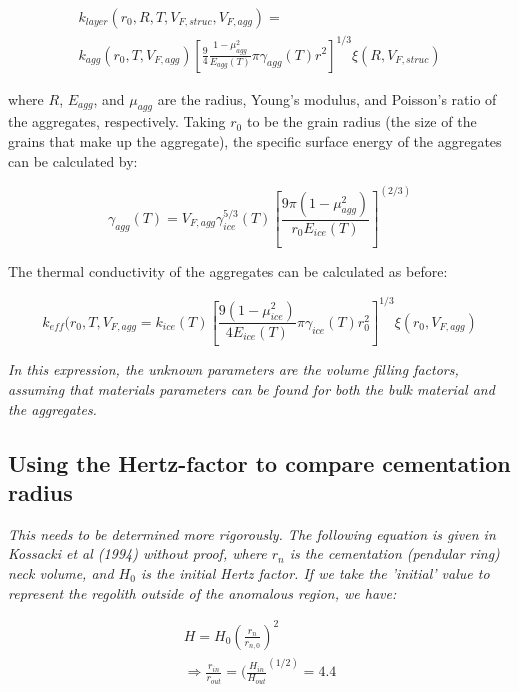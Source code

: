 \documentclass[11pt]{article} %
\begin{document}
	 \begin{equation}
	 \begin{split}
	 k_{layer}(r_{0}, R, T, V_{F, struc}, V_{F, agg}) = \\
	 k_{agg}(r_{0}, T, V_{F, agg}) [\frac{9}{4} \frac{1 - \mu_{agg}^{2}}{E_{agg}(T)}  \pi \gamma_{agg}(T) r^{2}]^{1/3} \xi(R, V_{F, struc})
	 \end{split}
	 \end{equation}
	 
	 where $R$, $E_{agg}$, and $\mu_{agg}$ are the radius, Young's modulus, and Poisson's ratio of the aggregates, respectively. Taking $r_{0}$ to be the grain radius (the size of the grains that make up the aggregate), the specific surface energy of the aggregates can be calculated by:
	 
	 \begin{equation}
	 \gamma_{agg}(T) = V_{F, agg} \gamma_{ice}^{5/3}(T)[\frac{9 \pi (1-\mu_{agg}^{2})}{r_{0} E_{ice}(T)}]^(2/3)
	 \end{equation}
	 
	 The thermal conductivity of the aggregates can be calculated as before:
	 
	 \begin{equation}
	 k_{eff}(r_{0}, T, V_{F, agg} = k_{ice}(T) [\frac{9 (1-\mu_{ice}^{2})}{4 E_{ice}(T)}\pi \gamma_{ice}(T) r_{0}^{2} ]^{1/3}\xi(r_{0}, V_{F, agg})
	 \end{equation}
	 
	\emph{ In this expression, the unknown parameters are the volume filling factors, assuming that materials parameters can be found for both the bulk material and the aggregates.}
	
\subsection{Using the Hertz-factor to compare cementation radius}

	\emph{This needs to be determined more rigorously. The following equation is given in Kossacki et al (1994) without proof, where $r_{n}$ is the cementation (pendular ring) neck volume, and $H_{0}$ is the initial Hertz factor. If we take the 'initial' value to represent the regolith outside of the anomalous region, we have:}
	
	\begin{equation}
	\begin{split}
	H = H_{0} (\frac{r_{n}}{r_{n,0}})^{2} \\
	\Rightarrow \frac{r_{in}}{r_{out}} = (\frac{H_{in}}{H_{out}}^(1/2) = 4.4
	\end{split}
	\end{equation}
	
\end{document}
